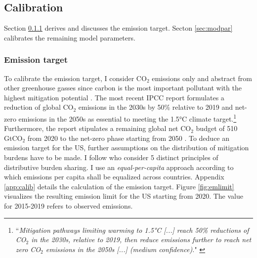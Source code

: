 \subsection{Calibration}\label{subsec:calib}


Section \ref{sec:ems} derives and discusses the emission target. 
Secton \ref{sec:modpar} calibrates the remaining model parameters.

\subsubsection{Emission target}\label{sec:ems}
To calibrate the emission target, I consider CO$_2$ emissions only and abstract from other greenhouse gasses since carbon is the most important pollutant with the highest mitigation potential \citep[p.29]{IPCC2022}.
The most recent IPCC report \citep{IPCC2022} formulates a reduction of global CO$_2$ emissions in the 2030s by 50\% relative to 2019 and net-zero emissions in the 2050s  as essential to meeting the 1.5°C climate target.\footnote{ ``\textit{Mitigation pathways limiting warming to 1.5°C [...] reach 50\% reductions of CO$_2$ in the 2030s, relative to 2019, then reduce emissions further to reach net zero CO$_2$ emissions in the 2050s [...] (\textnormal{medium confidence}).}" \citep[p.5, Chapter 3]{IPCC2022} }  Furthermore, the report stipulates a remaining global net CO$_2$ budget of 510 GtCO$_2$ %
from 2020 to the net-zero phase starting from 2050 \citep[p.5, Chapter 3]{IPCC2022}. 
To deduce an emission target for the US, further assumptions on the distribution of mitigation burdens have to be made. I follow \cite{RobiouDuPont2017EquitableGoals} who consider 5 distinct principles of distributive burden sharing. I use an \textit{equal-per-capita} approach according to which emissions per capita shall be equalized across countries. 
 Appendix \ref{app:calib} details the calculation of the emission target. 
Figure \ref{fig:emlimit}  visualizes the resulting emission limit for the US starting from 2020. The value for 2015-2019 refers to observed emissions.

